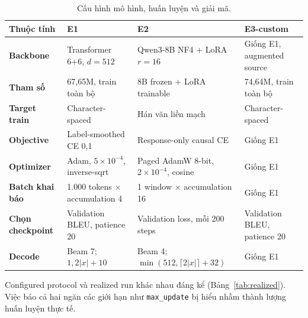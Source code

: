 \begin{table}[tbp]
  \centering
  \footnotesize
  \renewcommand{\arraystretch}{1.16}
  \setlength{\tabcolsep}{3.5pt}
  \caption{Cấu hình mô hình, huấn luyện và giải mã.}
  \label{tab:configs}
  \begin{tabularx}{\textwidth}{@{}>{\bfseries}p{2.45cm}XXX@{}}
    \toprule
    Thuộc tính & E1 & E2 & E3-custom \\
    \midrule
    Backbone
      & Transformer 6+6, $d=512$
      & Qwen3-8B NF4 + LoRA $r=16$
      & Giống E1, augmented source \\
    Tham số
      & 67,65M, train toàn bộ
      & 8B frozen + LoRA trainable
      & 74,64M, train toàn bộ \\
    Target train
      & Character-spaced & Hán văn liền mạch & Character-spaced \\
    Objective
      & Label-smoothed CE 0,1 & Response-only causal CE & Giống E1 \\
    Optimizer
      & Adam, $5\times10^{-4}$, inverse-sqrt
      & Paged AdamW 8-bit, $2\times10^{-4}$, cosine
      & Giống E1 \\
    Batch khai báo
      & 1.000 tokens $\times$ accumulation 4
      & 1 window $\times$ accumulation 16
      & Giống E1 \\
    Chọn checkpoint
      & Validation BLEU, patience 20
      & Validation loss, mỗi 200 steps
      & Validation BLEU, patience 20 \\
    Decode
      & Beam 7; $1{,}2|x|+10$
      & Beam 4; $\min(512,\lceil2|x|\rceil+32)$
      & Giống E1 \\
    \bottomrule
  \end{tabularx}
\end{table}

Configured protocol và realized run khác nhau đáng kể
(Bảng~\ref{tab:realized}). Việc báo cả hai ngăn các giới hạn như
\texttt{max\_update} bị hiểu nhầm thành lượng huấn luyện thực tế.

